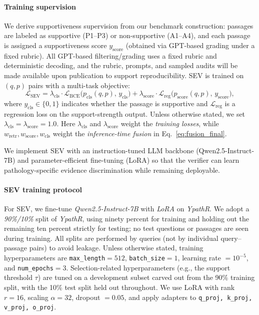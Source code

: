 \documentclass[preprint,12pt,a4paper]{elsarticle}
\begin{document}
\paragraph{Training supervision}
We derive supportiveness supervision from our benchmark construction:
passages are labeled as supportive (\textsc{P1--P3}) or non-supportive (\textsc{A1--A4}), and each passage is assigned a supportiveness score $y_{\text{score}}$ (obtained via GPT-based grading under a fixed rubric).
All GPT-based filtering/grading uses a fixed rubric and deterministic decoding, and the rubric, prompts, and sampled audits will be made available upon publication to support reproducibility.
SEV is trained on $(q,p)$ pairs with a multi-task objective:
\begin{equation}
\label{eq:sev_loss}
\mathcal{L}_{\text{SEV}}
=
\lambda_{\text{cls}}\cdot \mathcal{L}_{\text{BCE}}\big(p_{\text{cls}}(q,p),\,y_{\text{cls}}\big)
+ \lambda_{\text{score}}\cdot \mathcal{L}_{\text{reg}}\big(p_{\text{score}}(q,p),\,y_{\text{score}}\big),
\end{equation}
where $y_{\text{cls}}\in\{0,1\}$ indicates whether the passage is supportive and $\mathcal{L}_{\text{reg}}$ is a regression loss on the support-strength output.
Unless otherwise stated, we set $\lambda_{\text{cls}}=\lambda_{\text{score}}=1.0$.
Here $\lambda_{\text{cls}}$ and $\lambda_{\text{score}}$ weight the \emph{training losses}, while $w_{\text{retr}}, w_{\text{score}}, w_{\text{cls}}$ weight the \emph{inference-time fusion} in Eq.~\eqref{eq:fusion_final}.

We implement SEV with an instruction-tuned LLM backbone (\mbox{Qwen2.5-Instruct-7B}) and parameter-efficient fine-tuning (LoRA) so that the verifier can learn pathology-specific evidence discrimination while remaining deployable.

\paragraph{SEV training protocol}
For SEV, we fine-tune \emph{\mbox{Qwen2.5-Instruct-7B}} with \emph{LoRA} on \emph{YpathR}.
We adopt a \emph{90\%/10\%} split of \emph{YpathR}, using ninety percent for training and holding out the remaining ten percent strictly for testing; no test questions or passages are seen during training.
All splits are performed by queries (not by individual query--passage pairs) to avoid leakage.
Unless otherwise stated, training hyperparameters are \texttt{max\_length}$=512$, \texttt{batch\_size}$=1$, learning rate $=10^{-5}$, and \texttt{num\_epochs}$=3$.
Selection-related hyperparameters (e.g., the support threshold $\tau$) are tuned on a development subset carved out from the 90\% training split, with the 10\% test split held out throughout.
We use LoRA with rank $r{=}16$, scaling $\alpha{=}32$, dropout $=0.05$, and apply adapters to \texttt{q\_proj, k\_proj, v\_proj, o\_proj}.
\end{document}
